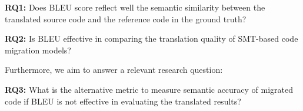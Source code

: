 {\bf RQ1:} Does BLEU score reflect well the semantic similarity between
the translated source code and the reference code in the ground truth?

{\bf RQ2:} Is BLEU effective in comparing the translation quality of SMT-based code migration models?


Furthermore, we aim to answer a relevant research question:

{\bf RQ3:} What is the alternative metric to measure semantic accuracy
of migrated code if BLEU is not effective in evaluating the translated results?
